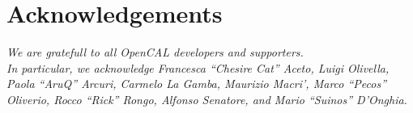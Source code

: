 \chapter*{Acknowledgements}


\emph{We are gratefull to all OpenCAL developers and supporters.\\
  In particular, we acknowledge Francesca ``Chesire Cat''
  Aceto, Luigi Olivella, Paola ``AruQ'' Arcuri, Carmelo La Gamba, Maurizio
  Macri', Marco ``Pecos'' Oliverio, Rocco ``Rick'' Rongo, Alfonso Senatore, and
  Mario ``Suinos'' D'Onghia.}

\newpage

